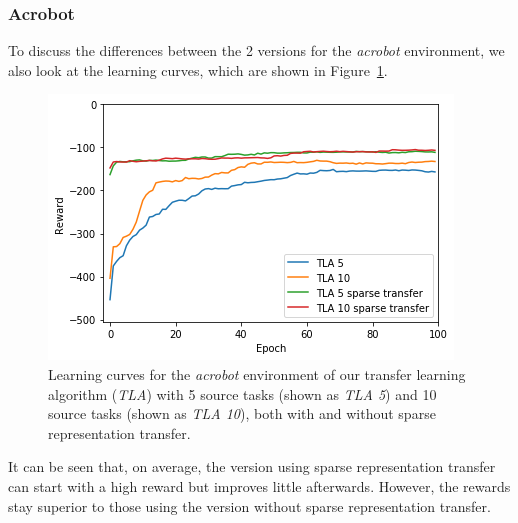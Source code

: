 \subsubsection{Acrobot} %
\label{ssub:with_sparse_representation_transfer:acrobot}
To discuss the differences between the 2 versions for the \textit{acrobot} environment, we also look at the learning curves, which are shown in Figure~\ref{fig:Acrobot:st:reward_target_without-with}.
\begin{figure}[htb]
    \centering
    \includegraphics[width=.8\linewidth]{images/results/Acrobot/sparse_transfer/reward_target_without_with.png}
    \caption[Learning curves for the \textit{acrobot} environment of \textit{TLA} with and without sparse representation transfer]{Learning curves for the \emph{acrobot} environment of our transfer learning algorithm (\textit{TLA}) with 5 source tasks (shown as \textit{TLA 5}) and 10 source tasks (shown as \textit{TLA 10}), both with and without sparse representation transfer.}
    \label{fig:Acrobot:st:reward_target_without-with}
\end{figure}
It can be seen that, on average, the version using sparse representation transfer can start with a high reward but improves little afterwards.
However, the rewards stay superior to those using the version without sparse representation transfer.\\


